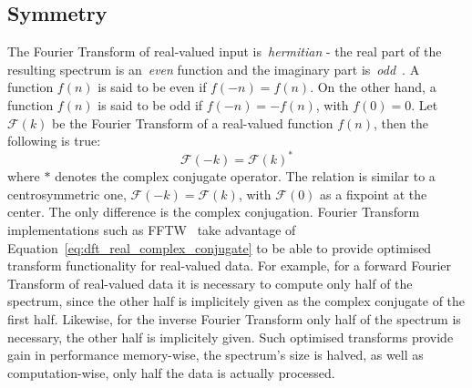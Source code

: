 \subsection{Symmetry}
The Fourier Transform of real-valued input is~\emph{hermitian} - the real part of the resulting spectrum
is an~\emph{even} function and the imaginary part is~\emph{odd}~\citep{book:bracewell2000fourier}.
A function $f(n)$ is said to be even if
$f(-n) = f(n)$. On the other hand, a function $f(n)$ is said to be odd if $f(-n) = -f(n)$,
with $f(0) = 0$. Let $\mathcal{F}(k)$ be the Fourier Transform of a real-valued function $f(n)$, then
the following is true:
\begin{equation}
\label{eq:dft_real_complex_conjugate}
 \mathcal{F}(-k) = \mathcal{F}(k)^*
\end{equation}
where $*$ denotes the complex conjugate operator. The relation is similar to a centrosymmetric one,
$\mathcal{F}(-k) = \mathcal{F}(k)$, with $\mathcal{F}(0)$ as a fixpoint at the center. The only
difference is the complex conjugation. Fourier Transform implementations such as FFTW~\citep{FFTW05}
take advantage of Equation~\ref{eq:dft_real_complex_conjugate} to be able to provide optimised
transform functionality for real-valued data. For example, for a forward Fourier Transform of real-valued data it is
necessary to compute only half of the spectrum, since the other half is implicitely given as the
complex conjugate of the first half. Likewise, for the inverse Fourier Transform only half of the
spectrum is necessary, the other half is implicitely given. Such optimised transforms provide
gain in performance memory-wise, the spectrum's size is halved, as well as computation-wise, only
half the data is actually processed.
%
